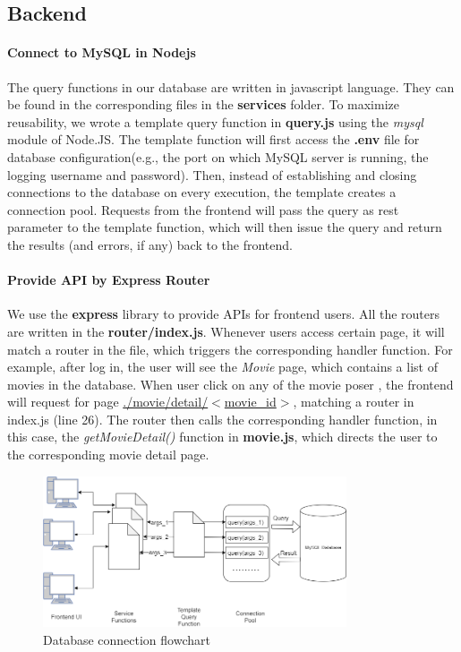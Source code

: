 \begin{CJK*}{UTF8}{gbsn}
\subsection{Backend}
\paragraph{Connect to MySQL in Nodejs}
The query functions in our database are written in javascript language. They can be found in the corresponding files in the \textbf{services} folder. To maximize reusability, we wrote a template query function in \textbf{query.js} using the \textit{mysql} module of Node.JS. The template function will first access the \textbf{.env} file for database configuration(e.g., the port on which MySQL server is running, the logging username and password). Then, instead of establishing and closing connections to the database on every execution, the template creates a connection pool. Requests from the frontend will pass the query as rest parameter to the template function, which will then issue the query and return the results (and errors, if any) back to the frontend.
\paragraph{Provide API by Express Router}
We use the \textbf{express} library to provide APIs for frontend users. All the routers are written in the \textbf{router/index.js}. Whenever users access certain page, it will match a router in the file, which triggers the corresponding handler function. For example, after log in, the user will see the \textit{Movie} page, which contains a list of movies in the database. When user click on any of the movie poser , the frontend will request for page \underline{./movie/detail/$<$movie\_id$>$}, matching a router in index.js (line 26). The router then calls the corresponding handler function, in this case, the \textit{getMovieDetail()} function in \textbf{movie.js}, which directs the user to the corresponding movie detail page.
\begin{figure}[h]
    \centering
    \includegraphics[width=0.8\textwidth]{sqlconnect.png}
    \caption{Database connection flowchart}
\end{figure}

\end{CJK*}
